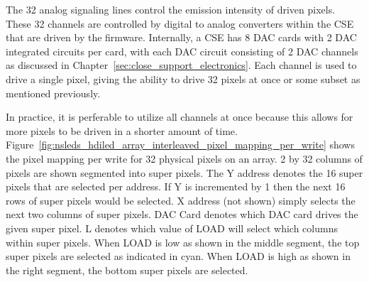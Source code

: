     The 32 analog signaling lines control the emission intensity of driven pixels. These 32 channels are controlled by digital to analog converters within the CSE that are driven by the firmware. Internally, a CSE has 8 DAC cards with 2 DAC integrated circuits per card, with each DAC circuit consisting of 2 DAC channels as discussed in Chapter~\ref{sec:close_support_electronics}. Each channel is used to drive a single pixel, giving the ability to drive 32 pixels at once or some subset as mentioned previously.

    In practice, it is perferable to utilize all channels at once because this allows for more pixels to be driven in a shorter amount of time. Figure~\ref{fig:nsleds_hdiled_array_interleaved_pixel_mapping_per_write} shows the pixel mapping per write for 32 physical pixels on an array. 2 by 32 columns of pixels are shown segmented into super pixels. The Y address denotes the 16 super pixels that are selected per address. If Y is incremented by 1 then the next 16 rows of super pixels would be selected. X address (not shown) simply selects the next two columns of super pixels. DAC Card denotes which DAC card drives the given super pixel. L denotes which value of LOAD will select which columns within super pixels. When LOAD is low as shown in the middle segment, the top super pixels are selected as indicated in cyan. When LOAD is high as shown in the right segment, the bottom super pixels are selected.

